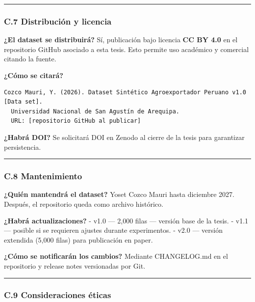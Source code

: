 \begin{center}\rule{0.5\linewidth}{0.5pt}\end{center}

\subsubsection{C.7 Distribución y
licencia}\label{c.7-distribuciuxf3n-y-licencia}

\textbf{¿El dataset se distribuirá?} Sí, publicación bajo licencia
\textbf{CC BY 4.0} en el repositorio GitHub asociado a esta tesis. Esto
permite uso académico y comercial citando la fuente.

\textbf{¿Cómo se citará?}

\begin{verbatim}
Cozco Mauri, Y. (2026). Dataset Sintético Agroexportador Peruano v1.0 [Data set].
  Universidad Nacional de San Agustín de Arequipa.
  URL: [repositorio GitHub al publicar]
\end{verbatim}

\textbf{¿Habrá DOI?} Se solicitará DOI en Zenodo al cierre de la tesis
para garantizar persistencia.

\begin{center}\rule{0.5\linewidth}{0.5pt}\end{center}

\subsubsection{C.8 Mantenimiento}\label{c.8-mantenimiento}

\textbf{¿Quién mantendrá el dataset?} Yoset Cozco Mauri hasta diciembre
2027. Después, el repositorio queda como archivo histórico.

\textbf{¿Habrá actualizaciones?} - v1.0 --- 2,000 filas --- versión base
de la tesis. - v1.1 --- posible si se requieren ajustes durante
experimentos. - v2.0 --- versión extendida (5,000 filas) para
publicación en paper.

\textbf{¿Cómo se notificarán los cambios?} Mediante CHANGELOG.md en el
repositorio y release notes versionadas por Git.

\begin{center}\rule{0.5\linewidth}{0.5pt}\end{center}

\subsubsection{C.9 Consideraciones
éticas}\label{c.9-consideraciones-uxe9ticas}

